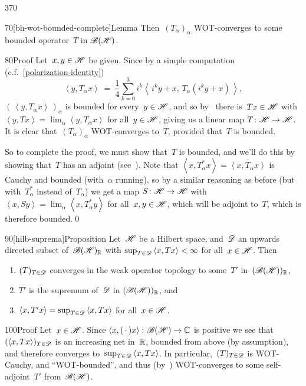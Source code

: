 \begin{parsec}{370}
\begin{point}{70}[bh-wot-bounded-complete]{Lemma}
Then~$(T_\alpha)_\alpha$
WOT-converges to some bounded operator~$T$ in $\mathscr{B}(\mathscr{H})$.
\begin{point}{80}{Proof}%
Let~$x,y\in \mathscr{H}$ be given.
Since by a simple computation
(c.f.~\eqref{polarization-identity})
\begin{equation*}
	\textstyle
	\left<y,T_\alpha x\right>
	\ = \ \frac{1}{4}\sum_{k=0}^3
	i^k\left<\,i^ky+x,\,T_\alpha (i^ky+x)\,\right>,
\end{equation*}
 $(\,\left<y,T_\alpha x\right>\,)_\alpha$
is bounded for every~$y\in \mathscr{H}$,
and so by~ there is~$Tx\in \mathscr{H}$ 
with $\left<y,Tx\right>=\lim_\alpha \left<y,T_\alpha x\right>$
for all~$y\in\mathscr{H}$,
giving us a linear map $T\colon \mathscr{H}\to \mathscr{H}$.
It is clear that~$(T_\alpha)_\alpha$
WOT-converges to~$T$,
provided that~$T$ is bounded.

So to complete the proof,
we must show that~$T$ is bounded,
and we'll do this by showing that~$T$ has an adjoint
(see~).
Note that $\left<x,T_\alpha^* x\right>=\overline{\left<x,T_\alpha x\right>}$
is Cauchy and bounded (with~$\alpha$ running),
so by a similar reasoning as before (but with~$T^*_\alpha$
instead of~$T_\alpha$)
we get a map
$S\colon \mathscr{H}\to\mathscr{H}$
with $\left<x,Sy\right>=\lim_\alpha \left<x,T^*_\alpha y\right>$
for all~$x,y\in\mathscr{H}$, which will be adjoint to~$T$,
which is therefore bounded.\qed
\end{point}
\end{point}
\begin{point}{90}[hilb-suprema]{Proposition}%
Let~$\mathscr{H}$ be a Hilbert space,
and~$\mathscr{D}$ an upwards directed subset of~$\mathscr{B}(\mathscr{H})_{\mathbb{R}}$
with $\sup_{T\in \mathscr{D}} \left<x,Tx\right> <\infty$
for all~$x\in \mathscr{H}$. Then
\begin{enumerate}
\item
$(T)_{T\in\mathscr{D}}$
converges 
in the weak operator topology
to some~$T'$ in~$(\mathscr{B}(\mathscr{H}))_{\mathbb{R}}$,
\item
$T'$ is the supremum of~$\mathscr{D}$
in $(\mathscr{B}(\mathscr{H}))_{\mathbb{R}}$,
and 
\item
$\left<x,T'x\right> = 
\sup_{T\in\mathscr{D}}\left<x,Tx\right> $
for all~$x\in \mathscr{H}$.
\end{enumerate}
\begin{point}{100}{Proof}%
Let~$x\in \mathscr{H}$.
Since $\left<x,(\,\cdot\,)x\right>\colon \mathscr{B}(\mathscr{H})\to \mathbb{C}$
is positive
we see that
$(\left<x,Tx\right>)_{T\in\mathscr{D}}$
is an increasing net in~$\mathbb{R}$, 
bounded from above (by assumption),
and therefore converges to~$\sup_{T\in\mathscr{D}}\left<x,Tx\right>$.
In particular,~$(T)_{T\in\mathscr{D}}$
is WOT-Cauchy,
and ``WOT-bounded'',
and thus
(by~)
WOT-converges to some self-adjoint~$T'$ from~$\mathscr{B}(\mathscr{H})$.


\end{point}
\end{point}
\end{parsec}
